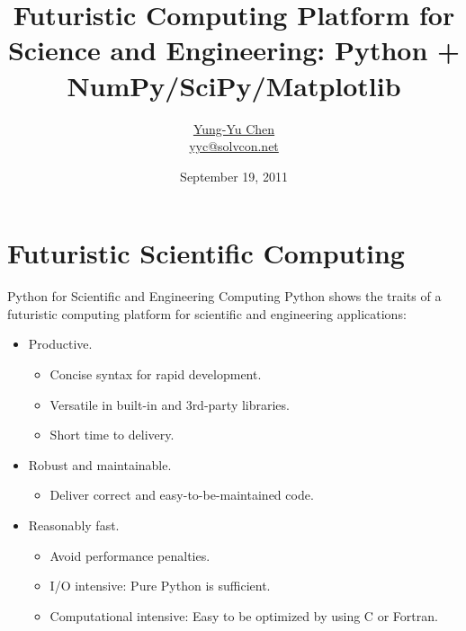 \documentclass[dvips,xcolor=pst]{beamer}
\title[Futuristic Computing with Python]{Futuristic Computing Platform for
Science and Engineering: Python + NumPy/SciPy/Matplotlib}
\author[\href{http://solvcon.net/yyc/}{Chen}]%
{\href{http://solvcon.net/yyc/}{Yung-Yu Chen} \\ {\scriptsize
\url{yyc@solvcon.net}}}
\institute[PyHUG]{Python Hsinchu User Group}
\date[2011/9/19]{September 19, 2011}
\begin{document}
\begin{frame}
\titlepage
\end{frame}

\section{
Futuristic Scientific Computing
}

\begin{frame}{
%
Python for Scientific and Engineering Computing
%
} \large
Python shows the traits of a futuristic computing platform for scientific and
engineering applications:
\begin{itemize} \large
  \item Productive.
  \begin{itemize} \large
    \item Concise syntax for rapid development.
    \item Versatile in built-in and 3rd-party libraries.
    \item Short time to delivery.
  \end{itemize}
  \item Robust and maintainable.
  \begin{itemize} \large
    \item Deliver correct and easy-to-be-maintained code.
  \end{itemize}
  \item Reasonably fast.
  \begin{itemize} \large
    \item Avoid performance penalties.
    \item I/O intensive: Pure Python is sufficient.
    \item Computational intensive: Easy to be optimized by using C or Fortran.
  \end{itemize}
\end{itemize}
\end{frame}
\end{document}
